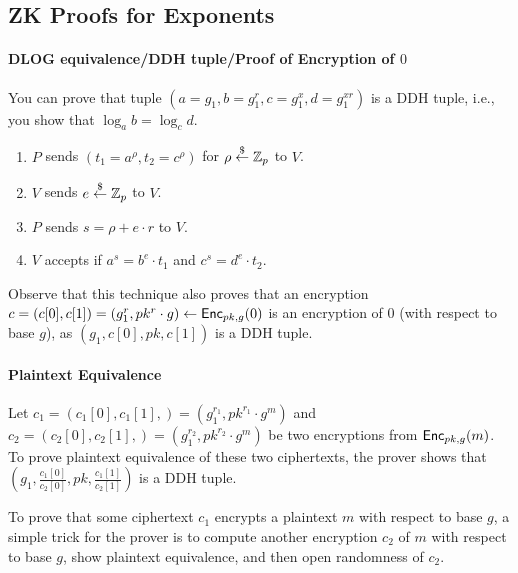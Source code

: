 \documentclass{article}
\begin{document}
\subsection{ZK Proofs for Exponents}
\paragraph{DLOG equivalence/DDH tuple/Proof of Encryption of $0$}
You can prove that tuple $(a=g_1,b=g_1^r,c=g_1^x,d=g_1^{xr})$ is a DDH
tuple, i.e., you show that $\log_{a}{b}=\log_c{d}$.

\begin{enumerate}
\item $P$ sends $(t_1=a^{\rho},t_2=c^{\rho})$ for $\rho\stackrel{\$}{\leftarrow}\mathbb{Z}_p$ to $V$.
  \item $V$ sends $e\stackrel{\$}{\leftarrow}\mathbb{Z}_p$ to $V$.
  \item $P$ sends $s=\rho+e\cdot{}r$ to $V$.
    \item $V$ accepts if $a^s=b^e\cdot{}t_1$ and $c^s=d^e\cdot{}t_2$.
\end{enumerate}

Observe that this technique also proves that an encryption
$c=(c[0],c[1])=(g_1^r,pk^r\cdot{}g)\leftarrow{\mathsf{Enc}}_{pk,g}(0)$ is an
encryption of $0$ (with respect to base $g$), as $(g_1,c[0],pk,c[1])$
is a DDH tuple.

\paragraph{Plaintext Equivalence}
Let $c_1=(c_1[0],c_1[1],)=(g_1^{r_1},pk^{r_1}\cdot{}g^m)$ and
$c_2=(c_2[0],c_2[1],)=(g_1^{r_2},pk^{r_2}\cdot{}g^m)$ be two
encryptions from ${\mathsf{Enc}}_{pk,g}(m)$. To prove plaintext equivalence of
these two ciphertexts, the prover shows that
$(g_1,\frac{c_1[0]}{c_2[0]},pk,\frac{c_1[1]}{c_2[1]})$ is a DDH tuple.

To prove that some ciphertext $c_1$ encrypts a plaintext $m$ with
respect to base $g$, a simple trick for the prover is to compute
another encryption $c_2$ of $m$ with respect to base $g$, show
plaintext equivalence, and then open randomness of $c_2$.
\end{document}
